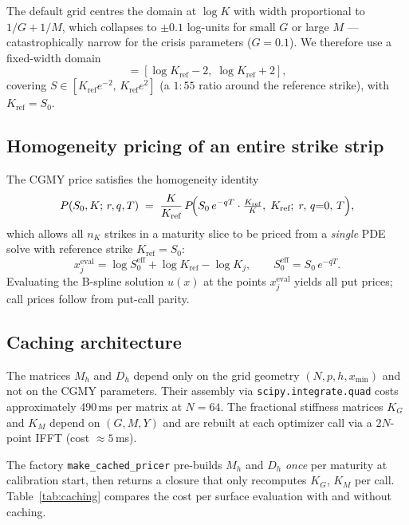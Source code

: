 \documentclass[11pt,a4paper]{article}
\begin{document}
The default grid centres the domain at $\log K$ with width proportional to
$1/G + 1/M$, which collapses to $\pm 0.1$ log-units for small $G$ or large
$M$ — catastrophically narrow for the crisis parameters ($G=0.1$).
We therefore use a fixed-width domain
\begin{equation}
  [x_{\min}, x_{\max}] = [\log K_{\text{ref}} - 2,\;
                           \log K_{\text{ref}} + 2],
  \label{eq:domain}
\end{equation}
covering $S \in [K_{\text{ref}} e^{-2},\, K_{\text{ref}} e^{2}]$
(a $1\!:\!55$ ratio around the reference strike),
with $K_{\text{ref}} = S_0$.

\subsection{Homogeneity pricing of an entire strike strip}

The CGMY price satisfies the homogeneity identity
\begin{equation}
  P(S_0, K;\, r, q, T) \;=\;
  \frac{K}{K_{\text{ref}}}\,
  P\!\Bigl(S_0\,e^{-qT}\cdot\tfrac{K_{\text{ref}}}{K},\;
           K_{\text{ref}};\; r,\, q{=}0,\, T\Bigr),
  \label{eq:homogeneity}
\end{equation}
which allows all $n_K$ strikes in a maturity slice to be priced from a
\emph{single} PDE solve with reference strike $K_{\text{ref}} = S_0$:
\begin{equation}
  x_j^{\text{eval}} = \log S_0^{\text{eff}} + \log K_{\text{ref}} - \log K_j,
  \qquad S_0^{\text{eff}} = S_0\,e^{-qT}.
  \label{eq:eval_points}
\end{equation}
Evaluating the B-spline solution $u(x)$ at the points $x_j^{\text{eval}}$
yields all put prices; call prices follow from put-call parity.

\subsection{Caching architecture}

The matrices $M_h$ and $D_h$ depend only on the grid geometry
$(N, p, h, x_{\min})$ and not on the CGMY parameters.
Their assembly via \texttt{scipy.integrate.quad} costs approximately
490\,ms per matrix at $N=64$.
The fractional stiffness matrices $K_G$ and $K_M$ depend on $(G, M, Y)$
and are rebuilt at each optimizer call via a $2N$-point IFFT
(cost $\approx 5$\,ms).

The factory \texttt{make\_cached\_pricer} pre-builds $M_h$ and $D_h$
\emph{once} per maturity at calibration start, then returns a closure that
only recomputes $K_G$, $K_M$ per call.
Table~\ref{tab:caching} compares the cost per surface evaluation
with and without caching.
\end{document}

